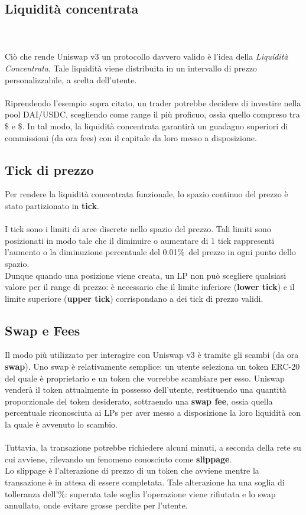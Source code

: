 \documentclass{report}
\begin{document}
\subsection{Liquidità concentrata}
\\\\Ciò che rende Uniswap v3 un protocollo davvero valido è l'idea della \textit{Liquidità Concentrata}\cite{concentrated_liquidity}. Tale liquidità viene distribuita in un intervallo di prezzo personalizzabile, a scelta dell'utente.
\\\\Riprendendo l'esempio sopra citato, un trader potrebbe decidere di investire nella pool DAI/USDC, scegliendo come range il più proficuo, ossia quello compreso tra \$ e \$.
In tal modo, la liquidità concentrata garantirà un guadagno superiori di commissioni (da ora fees) con il capitale da loro messo a disposizione.

\subsection{Tick di prezzo}

Per rendere la liquidità concentrata funzionale, lo spazio continuo del prezzo è stato partizionato in \textbf{tick}.
\\\\I tick sono i limiti di aree discrete nello spazio del prezzo. Tali limiti sono posizionati in modo tale che il diminuire o aumentare di 1 tick rappresenti l'aumento o la diminuzione percentuale del 0.01\%\ del prezzo in ogni punto dello spazio.
\\Dunque quando una posizione viene creata, un LP non può scegliere qualsiasi valore per il range di prezzo: è necessario che il limite inferiore (\textbf{lower tick}) e il limite superiore (\textbf{upper tick}) corrispondano a dei tick di prezzo validi.

\subsection{Swap e Fees}

Il modo più utilizzato per interagire con Uniswap v3 è tramite gli scambi (da ora \textbf{swap}).
Uno swap è relativamente semplice: un utente seleziona un token ERC-20 del quale è proprietario e un token che vorrebbe scambiare per esso. Uniswap venderà il token attualmente in possesso dell'utente, restituendo una quantità proporzionale del token desiderato, sottraendo una \textbf{swap fee}, ossia quella percentuale riconosciuta ai LPs per aver messo a disposizione la loro liquidità con la quale è avvenuto lo scambio.
\\\\Tuttavia, la transazione potrebbe richiedere alcuni minuti, a seconda della rete su cui avviene, rilevando un fenomeno conosciuto come \textbf{slippage}.
\\Lo slippage è l'alterazione di prezzo di un token che avviene mentre la transazione è in attesa di essere completata. Tale alterazione ha una soglia di tolleranza dell'\%: superata tale soglia l'operazione viene rifiutata e lo swap annullato, onde evitare grosse perdite per l'utente.
\end{document}
